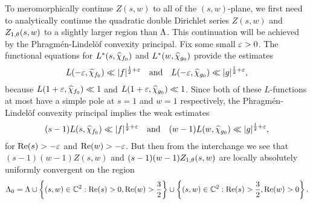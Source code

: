 \documentclass[12pt,reqno,oneside]{amsart}
\begin{document}
     To meromorphically continue $Z(s,w)$ to all of the $(s,w)$-plane, we first need to analytically continue the quadratic double Dirichlet series $Z(s,w)$ and $Z_{1,\theta}(s,w)$ to a slightly larger region than $\Lambda$. This continuation will be achieved by the Phragm\'en-Lindel\"of convexity principal. Fix some small $\varepsilon > 0$. The functional equations for $L^{\ast}(s,\widehat{\chi}_{f_{0}})$ and $L^{\ast}(w,\widehat{\chi}_{g_{0}})$ provide the estimates
    \[
        L(-\varepsilon,\widehat{\chi}_{f_{0}}) \ll |f|^{\frac{1}{2}+\varepsilon} \quad \text{and} \quad L(-\varepsilon,\widehat{\chi}_{g_{0}}) \ll |g|^{\frac{1}{2}+\varepsilon},
    \]
    because $L(1+\varepsilon,\widehat{\chi}_{f_{0}}) \ll 1$ and $L(1+\varepsilon,\widehat{\chi}_{g_{0}}) \ll 1$. Since both of these $L$-functions at most have a simple pole at $s = 1$ and $w = 1$ respectively, the Phragm\'en-Lindel\"of convexity principal implies the weak estimates
    \[
        (s-1)L(s,\widehat{\chi}_{f_{0}}) \ll |f|^{\frac{1}{2}+\varepsilon} \quad \text{and} \quad (w-1)L(w,\widehat{\chi}_{g_{0}}) \ll |g|^{\frac{1}{2}+\varepsilon},
    \]
    for $\mathrm{Re}(s) > -\varepsilon$ and $\mathrm{Re}(w) > -\varepsilon$. But then from the interchange we see that $(s-1)(w-1)Z(s,w)$ and $(s-1)(w-1)Z_{1,\theta}(s,w)$ are locally absolutely uniformly convergent on the region
    \[
        \Lambda_{0} = \Lambda \cup \left\{(s,w) \in \mathbb{C}^{2}:\mathrm{Re}(s) > 0, \mathrm{Re}(w) > \frac{3}{2}\right\} \cup \left\{(s,w) \in \mathbb{C}^{2}:\mathrm{Re}(s) > \frac{3}{2}, \mathrm{Re}(w) > 0\right\}.
    \]
    
    \begin{center}
    \end{center}
    
\end{document}
